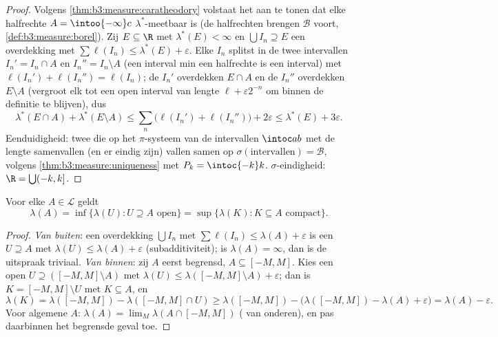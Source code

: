 \begin{proof}
Volgens \cref{thm:b3:measure:caratheodory} volstaat het aan te
tonen dat elke halfrechte $A = \intoo{-\infty}c$
$\lambda^*$-meetbaar is (de halfrechten brengen $\mathcal B$
voort, \cref{def:b3:measure:borel}). Zij $E \subseteq \R$ met
$\lambda^*(E) < \infty$ en $\bigcup I_n \supseteq E$ een
overdekking met $\sum\ell(I_n) \leq \lambda^*(E) + \varepsilon$.
Elke $I_n$ splitst in de twee intervallen $I_n' = I_n \cap A$ en
$I_n'' = I_n\setminus A$ (een interval min een halfrechte is een
interval) met $\ell(I_n') + \ell(I_n'') = \ell(I_n)$; de $I_n'$
overdekken $E \cap A$ en de $I_n''$ overdekken $E \setminus A$
(vergroot elk tot een open interval van lengte $\ell +
\varepsilon2^{-n}$ om binnen de definitie te blijven), dus
\[
\lambda^*(E\cap A) + \lambda^*(E\setminus A)
\leq \sum_n\bigl(\ell(I_n') + \ell(I_n'')\bigr) + 2\varepsilon
\leq \lambda^*(E) + 3\varepsilon .
\]
Eenduidigheid: twee  die op het $\pi$-systeem van de
intervallen $\intoc ab$ met de lengte samenvallen (en er eindig
zijn) vallen samen op $\sigma(\text{intervallen}) = \mathcal B$,
volgens \cref{thm:b3:measure:uniqueness} met $P_k = \intoc{-k}k$.
$\sigma$-eindigheid: $\R = \bigcup(-k, k]$.
\end{proof}

\begin{theorem}[Regulariteit]\label{thm:b3:measure:regularity}
Voor elke $A \in \mathcal L$ geldt
\[
\lambda(A) = \inf\{\lambda(U) : U \supseteq A \text{ open}\}
= \sup\{\lambda(K) : K \subseteq A \text{ compact}\}.
\]
\end{theorem}

\begin{proof}
\emph{Van buiten}: een overdekking $\bigcup I_n$ met
$\sum\ell(I_n) \leq \lambda(A) + \varepsilon$ is een  $U \supseteq A$ met $\lambda(U) \leq \lambda(A) +
\varepsilon$ (subadditiviteit); is $\lambda(A) = \infty$, dan is
de uitspraak triviaal. \emph{Van binnen}: zij $A$ eerst begrensd,
$A \subseteq [-M, M]$. Kies een open $U \supseteq ([-M,M]\setminus
A)$ met $\lambda(U) \leq \lambda([-M,M]\setminus A) +
\varepsilon$; dan is $K = [-M, M]\setminus U$  met $K
\subseteq A$, en
\[
\lambda(K) = \lambda([-M,M]) - \lambda([-M,M]\cap U)
\geq \lambda([-M,M]) - \bigl(\lambda([-M,M]) - \lambda(A) +
\varepsilon\bigr) = \lambda(A) - \varepsilon .
\]
Voor algemene $A$: $\lambda(A) = \lim_M\lambda(A\cap[-M,M])$
( van onderen), en pas daarbinnen het begrensde geval
toe.
\end{proof}

